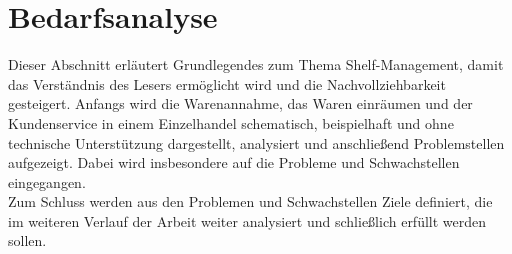 \chapter{Bedarfsanalyse}
\label{cha:bedarfsanalyse}
Dieser Abschnitt erläutert Grundlegendes zum Thema Shelf-Management, damit das Verständnis des Lesers ermöglicht wird und die Nachvollziehbarkeit gesteigert. Anfangs wird die Warenannahme, das Waren einräumen und der Kundenservice in einem Einzelhandel schematisch, beispielhaft und ohne technische Unterstützung dargestellt, analysiert und anschließend Problemstellen aufgezeigt. Dabei wird insbesondere auf die Probleme und Schwachstellen eingegangen.
\\
Zum Schluss werden aus den Problemen und Schwachstellen Ziele definiert, die im weiteren Verlauf der Arbeit weiter analysiert und schließlich erfüllt werden sollen.
